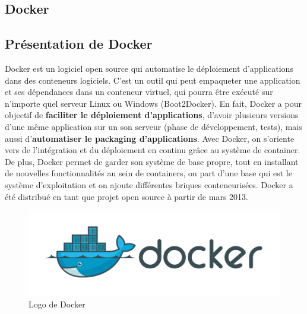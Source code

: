 \begin{onehalfspace}
\section{Docker}
\subsection{Présentation de Docker}
Docker est un logiciel open source qui automatise le déploiement d'applications dans des conteneurs logiciels. C'est un outil qui peut empaqueter une application et ses dépendances dans un conteneur virtuel, qui pourra être exécuté sur n'importe quel serveur Linux ou Windows (Boot2Docker). En fait, Docker a pour objectif de \textbf{faciliter le déploiement d’applications}, d’avoir plusieurs versions d’une même application sur un son serveur (phase de développement, tests), mais aussi d’\textbf{automatiser le packaging d’applications}. Avec Docker, on s’oriente vers de l’intégration et du déploiement en continu grâce au système de container. De plus, Docker permet de garder son système de base propre, tout en installant de nouvelles fonctionnalités au sein de containers, on part d’une base qui est le système d’exploitation et on ajoute différentes briques conteneurisées. Docker a été distribué en tant que projet open source à partir de mars 2013.
\begin{figure}[H]
\centering
\includegraphics [scale=0.5]{chapitre2/assets/docker.png}
\caption{Logo de Docker}
\end{figure}


\end{onehalfspace}
